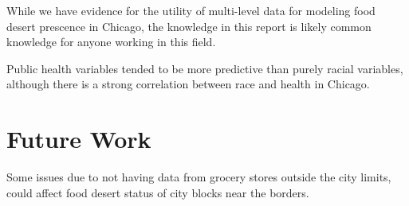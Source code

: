 \documentclass{report}
\begin{document}
While we have evidence for the utility of multi-level data for modeling food desert prescence in Chicago, the knowledge in this report is likely common knowledge for anyone working in this field.

Public health variables tended to be more predictive than purely racial variables, although there is a strong correlation between race and health in Chicago. 

\section*{Future Work}
Some issues due to not having data from grocery stores outside the city limits, could affect food desert status of city blocks near the borders. 
\end{document}
